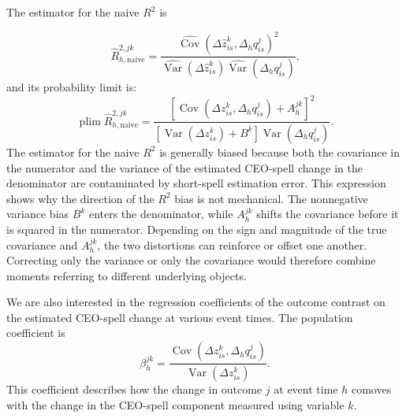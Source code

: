 \documentclass[sigconf,nonacm]{acmart}
\begin{document}
The estimator for the naive $R^2$ is

\begin{equation}
\widehat R^{2,jk}_{h,\mathrm{naive}}
=
\frac{
\widehat{\operatorname{Cov}}\!\left(
\Delta\widehat z^{k}_{is},
\Delta_{h} q^{j}_{is}
\right)^2
}{
\widehat{\operatorname{Var}}\!\left(
\Delta\widehat z^{k}_{is}
\right)
\widehat{\operatorname{Var}}\!\left(
\Delta_{h} q^{j}_{is}
\right)
}.
\end{equation}
and its probability limit is:
\begin{equation}
\operatorname{plim}
\widehat R^{2,jk}_{h,\mathrm{naive}}
=
\frac{
\left[
\operatorname{Cov}\!\left(
\Delta z^k_{is},
\Delta_h q^j_{is}
\right)
+A_h^{jk}
\right]^2
}{
\left[
\operatorname{Var}\!\left(
\Delta z^k_{is}
\right)
+B^k
\right]
\operatorname{Var}\!\left(
\Delta_h q^j_{is}
\right)
}.
\end{equation}
The estimator for the naive $R^2$ is generally biased because both the covariance in the numerator and the variance of the estimated CEO-spell change in the denominator are contaminated by short-spell estimation error.
This expression shows why the direction of the $R^2$ bias is not mechanical. The nonnegative variance bias $B^k$ enters the denominator, while $A_h^{jk}$ shifts the covariance before it is squared in the numerator. Depending on the sign and magnitude of the true covariance and $A_h^{jk}$, the two distortions can reinforce or offset one another. Correcting only the variance or only the covariance would therefore combine moments referring to different underlying objects.

We are also interested in the regression coefficients of the outcome contrast on the estimated CEO-spell change at various event times. The population coefficient is
\begin{equation}
\beta_h^{jk}
=
\frac{
\operatorname{Cov}\!\left(
\Delta z_{is}^{k},
\Delta_h q_{is}^{j}
\right)
}{
\operatorname{Var}\!\left(
\Delta z_{is}^{k}
\right)
}.
\label{eq:population_beta}
\end{equation}
This coefficient describes how the change in outcome $j$ at event time
$h$ comoves with the change in the CEO-spell component measured using
variable $k$.
\end{document}
